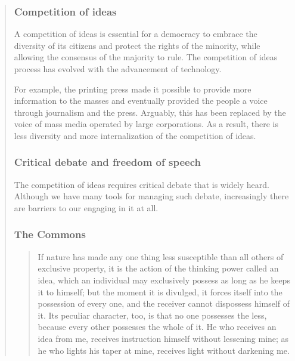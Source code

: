 \begin{quote}
\subsubsection{Competition of ideas}

A competition of ideas is essential for a democracy to embrace the diversity of its citizens and protect the rights of the minority, while allowing the consensus of the majority to rule. The competition of ideas process has evolved with the advancement of technology.

For example, the printing press made it possible to provide more information to the masses and eventually provided the people a voice through journalism and the press. Arguably, this has been replaced by the voice of mass media operated by large corporations. As a result, there is less diversity and more internalization of the competition of ideas.

\subsubsection{Critical debate and freedom of speech}

The competition of ideas requires critical debate that is widely heard. Although we have many tools for managing such debate, increasingly there are barriers to our engaging in it at all.


\subsubsection{The Commons}

\begin{quotation}If nature has made any one thing less susceptible than all others of exclusive property, it is the action of the thinking power called an idea, which an individual may exclusively possess as long as he keeps it to himself; but the moment it is divulged, it forces itself into the possession of every one, and the receiver cannot dispossess himself of it. Its peculiar character, too, is that no one possesses the less, because every other possesses the whole of it. He who receives an idea from me, receives instruction himself without lessening mine; as he who lights his taper at mine, receives light without darkening me.


\end{quotation}
\end{quote}
